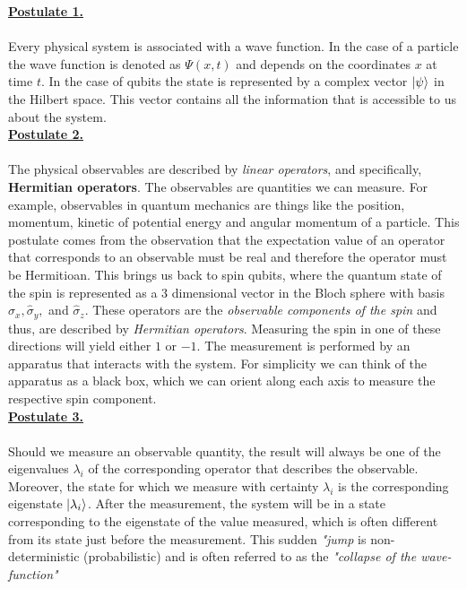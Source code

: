 \documentclass[12pt,a4paper]{report}
\begin{document}
\noindent
{\large \textbf{\underline{Postulate 1.}}}
\\~\\
Every physical system is associated with a wave function. In the case of a particle the wave function is denoted as $\Psi(x,t)$ and depends on the coordinates $x$ at time $t$. In the case of qubits the state is represented by a complex vector $\ket{\psi}$ in the Hilbert space. This vector contains all the information that is accessible to us about the system.
\\

\noindent
{\large \textbf{\underline{Postulate 2.}}}
\\~\\
The physical observables are described by \emph{linear operators}, and specifically, \textbf{Hermitian operators}. The observables are quantities we can measure. For example, observables in quantum mechanics are things like the position, momentum, kinetic of potential energy and angular momentum of a particle. This postulate comes from the observation that the expectation value of an operator that corresponds to an observable must be real and therefore the operator must be Hermitioan. This brings us back to spin qubits, where the quantum state of the spin is represented as a 3 dimensional vector in the Bloch sphere with basis $\hat{\sigma}_x, \hat{\sigma}_y,$ and $\hat{\sigma}_z$. These operators are the \emph{observable components of the spin} and thus, are described by \emph{Hermitian operators}. Measuring the spin in one of these directions will yield either $1$ or $-1$. The measurement is performed by an apparatus that interacts with the system. For simplicity we can think of the apparatus as a black box, which we can orient along each axis to measure the respective spin component.
\\

\noindent
{\large \textbf{\underline{Postulate 3.}}}
\\~\\
Should we measure an observable quantity, the result will always be one of the eigenvalues $\lambda_i$ of the corresponding operator that describes the observable. Moreover, the state for which we measure with certainty $\lambda_i$ is the corresponding eigenstate $\ket{\lambda_i}$. After the measurement, the system will be in a state corresponding to the eigenstate of the value measured, which is often different from its state just before the measurement. This sudden \textit{"jump} is non-deterministic (probabilistic) and is often referred to as the \textit{"collapse of the wave-function"}
\\
\end{document}
